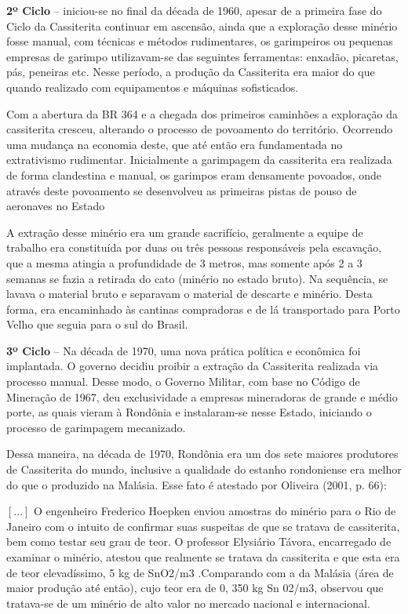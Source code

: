 \documentclass[article,12pt,onesidea,4paper,english,brazil]{abntex2}
\begin{document}
\textbf{2º Ciclo} – iniciou-se no final da década de 1960, apesar de a primeira fase do Ciclo da Cassiterita continuar em ascensão, ainda que a exploração desse minério fosse manual, com técnicas e métodos rudimentares, os garimpeiros ou pequenas empresas de garimpo utilizavam-se das seguintes ferramentas: enxadão, picaretas, pás, peneiras etc. Nesse período, a produção da Cassiterita era maior do que quando realizado com equipamentos e máquinas sofisticados.

Com a abertura da BR 364 e a chegada dos primeiros caminhões a exploração da cassiterita cresceu, alterando o processo de povoamento do território. Ocorrendo uma mudança na economia deste, que até então era fundamentada no extrativismo rudimentar. Inicialmente a garimpagem da cassiterita era realizada de forma clandestina e manual, os garimpos eram densamente povoados, onde através deste povoamento se desenvolveu as primeiras pistas de pouso de aeronaves no Estado 

A extração desse minério era um grande sacrifício, geralmente a equipe de trabalho era constituída por duas ou três pessoas responsáveis pela escavação, que a mesma atingia a profundidade de 3 metros, mas somente após 2 a 3 semanas se fazia a retirada do cato (minério no estado bruto). Na sequência, se lavava o material bruto e separavam o material de descarte e minério. Desta forma, era encaminhado às cantinas compradoras e de lá transportado para Porto Velho que seguia para o sul do Brasil.

\textbf{3º Ciclo} – Na década de 1970, uma nova prática política e econômica foi implantada. O governo decidiu proibir a extração da Cassiterita realizada via processo manual. Desse modo, o Governo Militar, com base no Código de Mineração de 1967, deu exclusividade a empresas mineradoras de grande e médio porte, as quais vieram à Rondônia e instalaram-se nesse Estado, iniciando o processo de garimpagem mecanizado.

Dessa maneira, na década de 1970, Rondônia era um dos sete maiores produtores de Cassiterita do mundo, inclusive a qualidade do estanho rondoniense era melhor do que o produzido na Malásia. Esse fato é atestado por Oliveira (2001, p. 66):

\begin{citacao}	
$[...]$ O engenheiro Frederico Hoepken enviou amostras do minério para o Rio de Janeiro com o intuito de confirmar suas suspeitas de que se tratava de cassiterita, bem como testar seu grau de teor. O professor Elysiário Távora, encarregado de examinar o minério, atestou que realmente se tratava da cassiterita e que esta era de teor elevadíssimo, 5 kg de SnO2/m3 .Comparando com a da Malásia (área de maior produção até então), cujo teor era de 0, 350 kg Sn 02/m3, observou que tratava-se de um minério de alto valor no mercado nacional e internacional.

\end{citacao}
\end{document}
